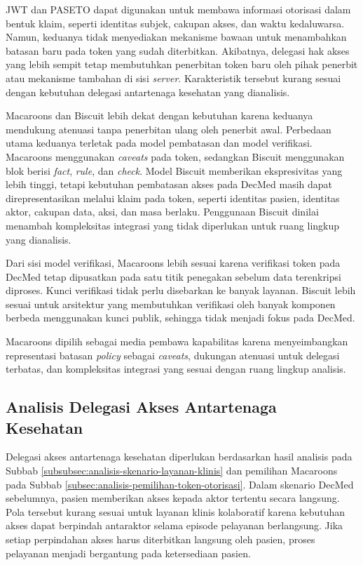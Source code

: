 \documentclass[bahasa, 12pt, a4paper, onecolumn, oneside, final]{report}
\begin{document}
JWT dan PASETO dapat digunakan untuk membawa informasi otorisasi dalam bentuk klaim, seperti identitas subjek, cakupan akses, dan waktu kedaluwarsa. Namun, keduanya tidak menyediakan mekanisme bawaan untuk menambahkan batasan baru pada token yang sudah diterbitkan. Akibatnya, delegasi hak akses yang lebih sempit tetap membutuhkan penerbitan token baru oleh pihak penerbit atau mekanisme tambahan di sisi \textit{server}. Karakteristik tersebut kurang sesuai dengan kebutuhan delegasi antartenaga kesehatan yang dianalisis.

Macaroons dan Biscuit lebih dekat dengan kebutuhan karena keduanya mendukung atenuasi tanpa penerbitan ulang oleh penerbit awal. Perbedaan utama keduanya terletak pada model pembatasan dan model verifikasi. Macaroons menggunakan \textit{caveats} pada token, sedangkan Biscuit menggunakan blok berisi \textit{fact}, \textit{rule}, dan \textit{check}. Model Biscuit memberikan ekspresivitas yang lebih tinggi, tetapi kebutuhan pembatasan akses pada DecMed masih dapat direpresentasikan melalui klaim pada token, seperti identitas pasien, identitas aktor, cakupan data, aksi, dan masa berlaku. Penggunaan Biscuit dinilai menambah kompleksitas integrasi yang tidak diperlukan untuk ruang lingkup yang dianalisis.

Dari sisi model verifikasi, Macaroons lebih sesuai karena verifikasi token pada DecMed tetap dipusatkan pada satu titik penegakan sebelum data terenkripsi diproses. Kunci verifikasi tidak perlu disebarkan ke banyak layanan. Biscuit lebih sesuai untuk arsitektur yang membutuhkan verifikasi oleh banyak komponen berbeda menggunakan kunci publik, sehingga tidak menjadi fokus pada DecMed.

Macaroons dipilih sebagai media pembawa kapabilitas karena menyeimbangkan representasi batasan \textit{policy} sebagai \textit{caveats}, dukungan atenuasi untuk delegasi terbatas, dan kompleksitas integrasi yang sesuai dengan ruang lingkup analisis. \subsection{Analisis Delegasi Akses Antartenaga Kesehatan}
\label{subsec:analisis-delegasi-atenuasi-offline}

Delegasi akses antartenaga kesehatan diperlukan berdasarkan hasil analisis pada Subbab \ref{subsubsec:analisis-skenario-layanan-klinis} dan pemilihan Macaroons pada Subbab \ref{subsec:analisis-pemilihan-token-otorisasi}. Dalam skenario DecMed sebelumnya, pasien memberikan akses kepada aktor tertentu secara langsung. Pola tersebut kurang sesuai untuk layanan klinis kolaboratif karena kebutuhan akses dapat berpindah antaraktor selama episode pelayanan berlangsung. Jika setiap perpindahan akses harus diterbitkan langsung oleh pasien, proses pelayanan menjadi bergantung pada ketersediaan pasien.
\end{document}

